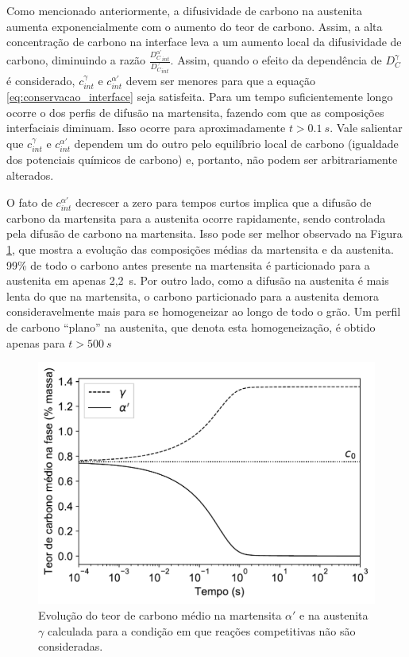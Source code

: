 Como mencionado anteriormente, a difusividade de carbono na austenita aumenta exponencialmente com o aumento do teor de carbono. Assim, a alta concentração de carbono na interface leva a um aumento local da difusividade de carbono, diminuindo a razão $\frac{{D_C^{\alpha\text{'}}}_{int}}{{D_C^\gamma}_{int}}$. Assim, quando o efeito da dependência de $D^\gamma_C$ é considerado, $c^\gamma_{int}$ e $c^{\alpha'}_{int}$ devem ser menores para que a equação \ref{eq:conservacao_interface} seja satisfeita. Para um tempo suficientemente longo ocorre o  dos perfis de difusão na martensita, fazendo com que as composições interfaciais diminuam. Isso ocorre para aproximadamente $t > \SI{0,1}{s}$. Vale salientar que $c^\gamma_{int}$ e $c^{\alpha'}_{int}$ dependem um do outro pelo equilíbrio local de carbono (igualdade dos potenciais químicos de carbono) e, portanto, não podem ser arbitrariamente alterados.

O fato de $c^{\alpha'}_{int}$ decrescer a zero para tempos curtos implica que a difusão de carbono da martensita para a austenita ocorre rapidamente, sendo controlada pela difusão de carbono na martensita. Isso pode ser melhor observado na Figura \ref{fig:cavg_sem_reacoes}, que mostra a evolução das composições médias da martensita e da austenita. 99\% de todo o carbono antes presente na martensita é particionado para a austenita em apenas 2,2~s. Por outro lado, como a difusão na austenita é mais lenta do que na martensita, o carbono particionado para a austenita demora consideravelmente mais para se homogeneizar ao longo de todo o grão. Um perfil de carbono ``plano'' na austenita, que denota esta homogeneização, é obtido apenas para $t > \SI{500}{s}$

\begin{figure}
  \includegraphics[width=.8\textwidth]{img/cpartition/CCE_cavg.pdf}
  \caption{Evolução do teor de carbono médio na martensita $\alpha'$ e na austenita $\gamma$ calculada para a condição em que reações competitivas não são consideradas.}
  \label{fig:cavg_sem_reacoes}
\end{figure}

